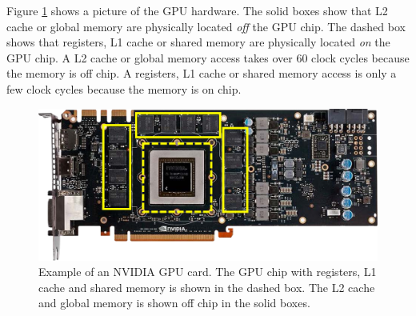 Figure \ref{fig:GPUarch} shows a picture of the GPU hardware.
The solid boxes show that L2 cache or global memory are physically located \textit{off} the GPU chip. 
The dashed box shows that registers, L1 cache or shared memory are physically located \textit{on} the GPU chip. 
A L2 cache or global memory access takes over 60 clock cycles because the memory is off chip. 
A registers, L1 cache or shared memory access is only a few clock cycles because the memory is on chip.
\begin{figure}
	\centering\includegraphics[width=\textwidth]{figures/gpu_intro/Kepler_box.png}
	\caption{Example of an NVIDIA GPU card. The GPU chip with registers, L1 cache and shared memory is shown in the dashed box.	The L2 cache and global memory is shown off chip in the solid boxes.}
	\label{fig:GPUarch}
\end{figure}

